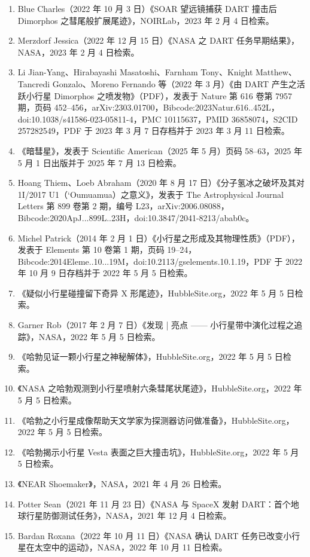 \begin{enumerate}
\item Blue Charles（2022 年 10 月 3 日）《SOAR 望远镜捕获 DART 撞击后 Dimorphos 之彗尾般扩展尾迹》，NOIRLab，2023 年 2 月 4 日检索。
\item Merzdorf Jessica（2022 年 12 月 15 日）《NASA 之 DART 任务早期结果》，NASA，2023 年 2 月 4 日检索。
\item Li Jian-Yang、Hirabayashi Masatoshi、Farnham Tony、Knight Matthew、Tancredi Gonzalo、Moreno Fernando 等（2022 年 3 月）《由 DART 产生之活跃小行星 Dimorphos 之喷发物》（PDF），发表于 Nature 第 616 卷第 7957 期，页码 452–456，arXiv:2303.01700，Bibcode:2023Natur.616..452L，doi:10.1038/s41586-023-05811-4，PMC 10115637，PMID 36858074，S2CID 257282549，PDF 于 2023 年 3 月 7 日存档并于 2023 年 3 月 11 日检索。
\item 《暗彗星》，发表于 Scientific American（2025 年 5 月）页码 58–63，2025 年 5 月 1 日出版并于 2025 年 7 月 13 日检索。
\item Hoang Thiem、Loeb Abraham（2020 年 8 月 17 日）《分子氢冰之破坏及其对 1I/2017 U1（‘Oumuamua）之意义》，发表于 The Astrophysical Journal Letters 第 899 卷第 2 期，编号 L23，arXiv:2006.08088，Bibcode:2020ApJ...899L..23H，doi:10.3847/2041-8213/abab0c。
\item Michel Patrick（2014 年 2 月 1 日）《小行星之形成及其物理性质》（PDF），发表于 Elements 第 10 卷第 1 期，页码 19–24，Bibcode:2014Eleme..10...19M，doi:10.2113/gselements.10.1.19，PDF 于 2022 年 10 月 9 日存档并于 2022 年 5 月 5 日检索。
\item 《疑似小行星碰撞留下奇异 X 形尾迹》，HubbleSite.org，2022 年 5 月 5 日检索。
\item Garner Rob（2017 年 2 月 7 日）《发现 | 亮点 —— 小行星带中演化过程之追踪》，NASA，2022 年 5 月 5 日检索。
\item 《哈勃见证一颗小行星之神秘解体》，HubbleSite.org，2022 年 5 月 5 日检索。
\item 《NASA 之哈勃观测到小行星喷射六条彗尾状尾迹》，HubbleSite.org，2022 年 5 月 5 日检索。
\item 《哈勃之小行星成像帮助天文学家为探测器访问做准备》，HubbleSite.org，2022 年 5 月 5 日检索。
\item 《哈勃揭示小行星 Vesta 表面之巨大撞击坑》，HubbleSite.org，2022 年 5 月 5 日检索。
\item 《NEAR Shoemaker》，NASA，2021 年 4 月 26 日检索。
\item Potter Sean（2021 年 11 月 23 日）《NASA 与 SpaceX 发射 DART：首个地球行星防御测试任务》，NASA，2021 年 12 月 4 日检索。
\item Bardan Roxana（2022 年 10 月 11 日）《NASA 确认 DART 任务已改变小行星在太空中的运动》，NASA，2022 年 10 月 11 日检索。

\end{enumerate}
